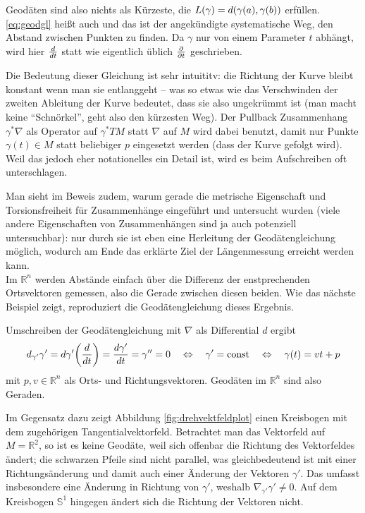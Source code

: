 \documentclass[../H_Analysis_main.tex]{subfiles}
\begin{document}
Geodäten sind also nichts als Kürzeste, die $L(\gamma) = d\qty(\gamma(a), \gamma(b))$ erfüllen. \eqref{eq:geodgl} heißt auch  und das ist der angekündigte systematische Weg, den Abstand zwischen Punkten zu finden. Da $\gamma$ nur von einem Parameter $t$ abhängt, wird hier $\dv{t}$ statt wie eigentlich üblich $\pdv{t}$ geschrieben.

Die Bedeutung dieser Gleichung ist sehr intuititv: die Richtung der Kurve bleibt konstant wenn man sie entlanggeht -- was so etwas wie das Verschwinden der zweiten Ableitung der Kurve bedeutet, dass sie also ungekrümmt ist (man macht keine \enquote{Schnörkel}, geht also den kürzesten Weg). Der Pullback Zusammenhang $\gamma^*\nabla$ als Operator auf $\gamma^* TM$ statt $\nabla$ auf $M$ wird dabei benutzt, damit nur Punkte $\gamma(t) \in M$ statt beliebiger $p$ eingesetzt werden (dass der Kurve gefolgt wird). Weil das jedoch eher notationelles ein Detail ist, wird es beim Aufschreiben oft unterschlagen.

Man sieht im Beweis zudem, warum gerade die metrische Eigenschaft und Torsionsfreiheit für Zusammenhänge eingeführt und untersucht wurden (viele andere Eigenschaften von Zusammenhängen sind ja auch potenziell untersuchbar): nur durch sie ist eben eine Herleitung der Geodätengleichung möglich, wodurch am Ende das erklärte Ziel der Längenmessung erreicht werden kann.\\


Im $\mathbb{R}^n$ werden Abstände einfach über die Differenz der enstprechenden Ortsvektoren gemessen, also die Gerade zwischen diesen beiden. Wie das nächste Beispiel zeigt, reproduziert die Geodätengleichung dieses Ergebnis.

\begin{bsp}[Geraden]
Umschreiben der Geodätengleichung mit $\nabla$ als Differential $d$ ergibt
\begin{equation}
d_{\gamma'} \gamma' = d\gamma'\qty(\dv{t}) = \dv{\gamma'}{t} = \gamma'' = 0 \quad \Leftrightarrow \quad \gamma' = \text{const} \quad \Leftrightarrow \quad \gamma(t) = v t + p
\end{equation}
mit $p, v \in \mathbb{R}^n$ als Orts- und Richtungsvektoren. Geodäten im $\mathbb{R}^n$ sind also Geraden.

Im Gegensatz dazu zeigt Abbildung \ref{fig:drehvektfeldplot} einen Kreisbogen mit dem zugehörigen Tangentialvektorfeld. Betrachtet man das Vektorfeld auf $M = \mathbb{R}^2$, so ist es keine Geodäte, weil sich offenbar die Richtung des Vektorfeldes ändert; die schwarzen Pfeile sind nicht parallel, was gleichbedeutend ist mit einer Richtungsänderung und damit auch einer Änderung der Vektoren $\gamma'$. Das umfasst insbesondere eine Änderung in Richtung von $\gamma'$, weshalb $\nabla_{\gamma'} \gamma' \neq 0$. Auf dem Kreisbogen $\mathbb{S}^1$ hingegen ändert sich die Richtung der Vektoren nicht.
\end{bsp}
\end{document}
